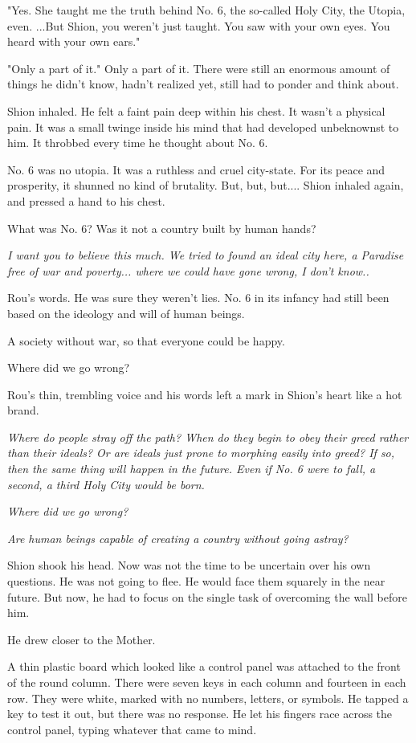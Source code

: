 "Yes. She taught me the truth behind No. 6, the so-called Holy City, the
Utopia, even. ...But Shion, you weren't just taught. You saw with your
own eyes. You heard with your own ears."

"Only a part of it." Only a part of it. There were still an enormous
amount of things he didn't know, hadn't realized yet, still had to
ponder and think about.

Shion inhaled. He felt a faint pain deep within his chest. It wasn't a
physical pain. It was a small twinge inside his mind that had developed
unbeknownst to him. It throbbed every time he thought about No. 6.

No. 6 was no utopia. It was a ruthless and cruel city-state. For its
peace and prosperity, it shunned no kind of brutality. But, but, but....
Shion inhaled again, and pressed a hand to his chest.

What was No. 6? Was it not a country built by human hands?

\emph{I want you to believe this much. We tried to found an ideal city here, a
	Paradise free of war and poverty... where we could have gone wrong, I
	don't know..}

Rou's words. He was sure they weren't lies. No. 6 in its infancy had
still been based on the ideology and will of human beings.

A society without war, so that everyone could be happy.

Where did we go wrong?

Rou's thin, trembling voice and his words left a mark in Shion's heart
like a hot brand.

\emph{Where do people stray off the path? When do they begin to obey their
	greed rather than their ideals? Or are ideals just prone to morphing
	easily into greed? If so, then the same thing will happen in the future.
	Even if No. 6 were to fall, a second, a third Holy City would be born.}

\emph{Where did we go wrong?}

\emph{Are human beings capable of creating a country without going astray?}

Shion shook his head. Now was not the time to be uncertain over his own
questions. He was not going to flee. He would face them squarely in the
near future. But now, he had to focus on the single task of overcoming
the wall before him.

He drew closer to the Mother.

A thin plastic board which looked like a control panel was attached to
the front of the round column. There were seven keys in each column and
fourteen in each row. They were white, marked with no numbers, letters,
or symbols. He tapped a key to test it out, but there was no response.
He let his fingers race across the control panel, typing whatever that
came to mind.


